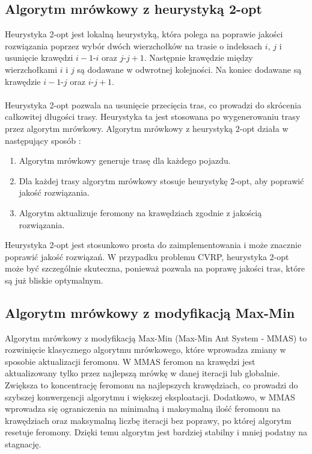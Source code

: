 \documentclass{article}
\begin{document}
\subsection{Algorytm mrówkowy z heurystyką 2-opt}
Heurystyka 2-opt jest lokalną heurystyką, która polega na poprawie jakości rozwiązania poprzez wybór dwóch wierzchołków na trasie o indeksach $i$, $j$ i usunięcie krawędzi $i - 1$-$i$ oraz $j$-$j+1$. Następnie krawędzie między wierzchołkami $i$ i $j$ są dodawane w odwrotnej kolejności. Na koniec dodawane są krawędzie $i-1$-$j$ oraz $i$-$j+1$.
\\ \\
Heurystyka 2-opt pozwala na usunięcie przecięcia tras, co prowadzi do skrócenia całkowitej długości trasy. Heurystyka ta jest stosowana po wygenerowaniu trasy przez algorytm mrówkowy. Algorytm mrówkowy z heurystyką 2-opt działa w następujący sposób \cite{tan}:
\begin{enumerate}
    \item Algorytm mrówkowy generuje trasę dla każdego pojazdu.
    \item Dla każdej trasy algorytm mrówkowy stosuje heurystykę 2-opt, aby poprawić jakość rozwiązania.
    \item Algorytm aktualizuje feromony na krawędziach zgodnie z jakością rozwiązania.
\end{enumerate}
Heurystyka 2-opt jest stosunkowo prosta do zaimplementowania i może znacznie poprawić jakość rozwiązań. W przypadku problemu CVRP, heurystyka 2-opt może być szczególnie skuteczna, ponieważ pozwala na poprawę jakości tras, które są już bliskie optymalnym.

\subsection{Algorytm mrówkowy z modyfikacją Max-Min}

Algorytm mrówkowy z modyfikacją Max-Min (Max-Min Ant System - MMAS) \cite{maxmin} to rozwinięcie klasycznego algorytmu mrówkowego, które wprowadza zmiany w sposobie aktualizacji feromonu. W MMAS feromon na krawędzi jest aktualizowany tylko przez najlepszą mrówkę w danej iteracji lub globalnie. Zwiększa to koncentrację feromonu na najlepszych krawędziach, co prowadzi do szybszej konwergencji algorytmu i większej eksploatacji. Dodatkowo, w MMAS wprowadza się ograniczenia na minimalną i maksymalną ilość feromonu na krawędziach oraz maksymalną liczbę iteracji bez poprawy, po której algorytm resetuje feromony. Dzięki temu algorytm jest bardziej stabilny i mniej podatny na stagnację. 
\end{document}
